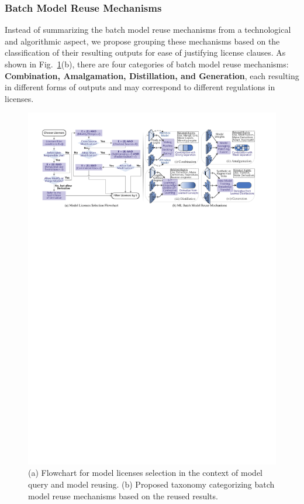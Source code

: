 \subsubsection{Batch Model Reuse Mechanisms}
\label{sec:taxonomy}
Instead of summarizing the batch model reuse mechanisms from a technological and algorithmic aspect, we propose grouping these mechanisms based on the classification of their resulting outputs for ease of justifying license clauses.
As shown in Fig.~\ref{fig:flowchart}(b), there are four categories of batch model reuse mechanisms: \textbf{Combination, Amalgamation, Distillation, and Generation}, each resulting in different forms of outputs and may correspond to different regulations in licenses.

\begin{figure}[t]
    \centering
    \includegraphics[width=\linewidth]{fig/flowchart.pdf}
    \caption{(a) Flowchart for model licenses selection in the context of model query and model reusing. (b) Proposed taxonomy categorizing batch model reuse mechanisms based on the reused results.}
    \Description{}
    \label{fig:flowchart}
\end{figure}

